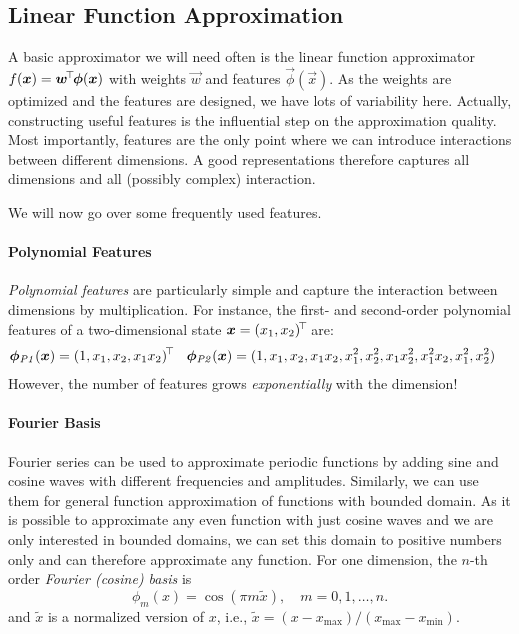 		\subsection{Linear Function Approximation}
			A basic approximator we will need often is the linear function approximator \( f(\bm{x}) = \bm{w}^{\!\top\!} \bm{\phi}(\bm{x}) \) with weights \(\vec{w}\) and features \(\vec{\phi}(\vec{x})\). As the weights are optimized and the features are designed, we have lots of variability here. Actually, constructing useful features is the influential step on the approximation quality. Most importantly, features are the only point where we can introduce interactions between different dimensions. A good representations therefore captures all dimensions and all (possibly complex) interaction.

			We will now go over some frequently used features.

			\paragraph{Polynomial Features}
				\emph{Polynomial features} are particularly simple and capture the interaction between dimensions by multiplication. For instance, the first- and second-order polynomial features of a two-dimensional state \( \bm{x} = (x_1, x_2)^{\!\top\!} \) are:
				\begin{align}
					\bm{\phi}_\mathit{P1}(\bm{x}) & = (1, x_1, x_2, x_1 x_2)^{\!\top\!}                                       &
					\bm{\phi}_\mathit{P2}(\bm{x}) & = (1, x_1, x_2, x_1 x_2, x_1^2, x_2^2, x_1 x_2^2, x_1^2 x_2, x_1^2, x_2^2)
				\end{align}
				However, the number of features grows \emph{exponentially} with the dimension!

			\paragraph{Fourier Basis}
				Fourier series can be used to approximate periodic functions by adding sine and cosine waves with different frequencies and amplitudes. Similarly, we can use them for general function approximation of functions with bounded domain. As it is possible to approximate any even function with just cosine waves and we are only interested in bounded domains, we can set this domain to positive numbers only and can therefore approximate any function. For one dimension, the \(n\)-th order \emph{Fourier (cosine) basis} is
				\begin{equation}
					\phi_m(x) = \cos(\pi m \tilde{x}),\quad m = 0, 1, \dots, n.
				\end{equation}
				and \( \tilde{x} \) is a normalized version of \(x\), i.e., \( \tilde{x} = (x - x_\mathrm{max}) / (x_\mathrm{max} - x_\mathrm{min}) \).

